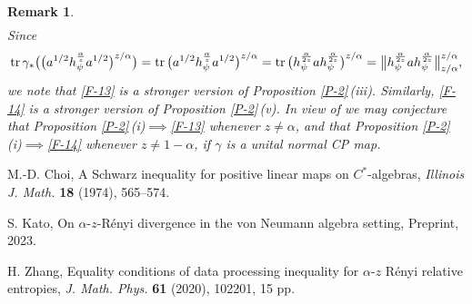 \documentclass[11pt,reqno]{article}
\newtheorem{remark}[thm]{Remark}
\numberwithin{equation}{section}
\def\tr{\mathrm{tr}\,}
\begin{document}
\begin{remark}
\begin{align}
\end{align}
Since
\[
\tr\gamma_*\bigl(\bigl(a^{1/2}h_\psi^{\alpha\over z}a^{1/2}\bigr)^{z/\alpha}\bigr)
=\tr\bigl(a^{1/2}h_\psi^{\alpha\over z}a^{1/2}\bigr)^{z/\alpha}
=\tr\bigl(h_\psi^{\alpha\over2z}ah_\psi^{\alpha\over2z}\bigr)^{z/\alpha}
=\big\|h_\psi^{\alpha\over2z}ah_\psi^{\alpha\over2z}\big\|_{z/\alpha}^{z/\alpha},
\]
we note that \eqref{F-13} is a stronger version of Proposition \ref{P-2}\,(iii). Similarly, \eqref{F-14} is a
stronger version of Proposition \ref{P-2}\,(v). {\color{red}In view of \cite[Theorem I.2\,(iii) and (iv)]{Zh} we may
conjecture that Proposition \ref{P-2}\,(i)$\implies$\eqref{F-13} whenever $z\ne\alpha$, and that
Proposition \ref{P-2}\,(i)$\implies$\eqref{F-14} whenever $z\ne1-\alpha$, if $\gamma$ is a unital normal CP map.}
\end{remark}

\begin{thebibliography}{99}

M.-D. Choi, A Schwarz inequality for positive linear maps on $C^*$-algebras,
{\it Illinois J. Math.} {\bf 18} (1974), 565--574.

S. Kato, On $\alpha$-$z$-R\'enyi divergence in the von Neumann algebra setting, Preprint, 2023.

H. Zhang, Equality conditions of data processing inequality for $\alpha$-$z$ R\'enyi relative entropies,
{\it J. Math. Phys.} {\bf 61} (2020), 102201, 15 pp.
\end{thebibliography}
\end{document}
